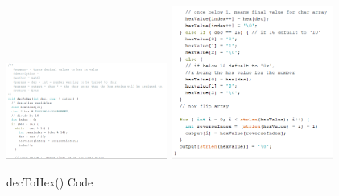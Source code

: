 \documentclass{report}
\begin{document}
\begin{figure}[h!]
    \centering
    \includegraphics[width=200]{hexToDec_1.PNG} 
    \includegraphics[width=200]{hexToDec_2.PNG}
    \caption{decToHex() Code}
    \label{fig:decToHex}
\end{figure} \\
\end{document}
